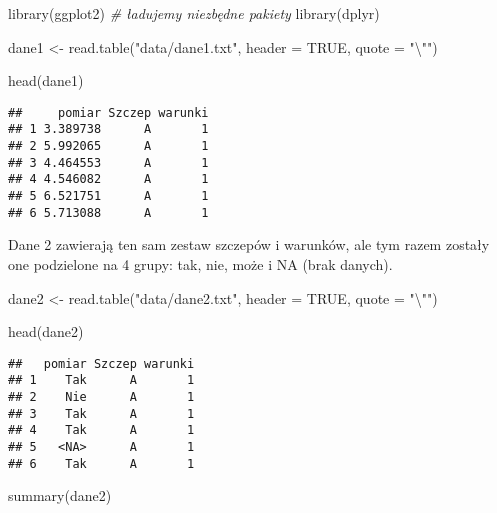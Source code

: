 \documentclass[
]{book}
\newenvironment{Shaded}{\begin{snugshade}}{\end{snugshade}}
\newcommand{\AttributeTok}[1]{\textcolor[rgb]{0.77,0.63,0.00}{#1}}
\newcommand{\CommentTok}[1]{\textcolor[rgb]{0.56,0.35,0.01}{\textit{#1}}}
\newcommand{\ConstantTok}[1]{\textcolor[rgb]{0.00,0.00,0.00}{#1}}
\newcommand{\FunctionTok}[1]{\textcolor[rgb]{0.00,0.00,0.00}{#1}}
\newcommand{\NormalTok}[1]{#1}
\newcommand{\OtherTok}[1]{\textcolor[rgb]{0.56,0.35,0.01}{#1}}
\newcommand{\SpecialCharTok}[1]{\textcolor[rgb]{0.00,0.00,0.00}{#1}}
\newcommand{\StringTok}[1]{\textcolor[rgb]{0.31,0.60,0.02}{#1}}
\begin{document}
\begin{Shaded}
\begin{Highlighting}[]
\FunctionTok{library}\NormalTok{(ggplot2) }\CommentTok{\# ładujemy niezbędne pakiety}
\FunctionTok{library}\NormalTok{(dplyr)}

\NormalTok{dane1 }\OtherTok{\textless{}{-}} \FunctionTok{read.table}\NormalTok{(}\StringTok{"data/dane1.txt"}\NormalTok{, }\AttributeTok{header =} \ConstantTok{TRUE}\NormalTok{, }\AttributeTok{quote =} \StringTok{"}\SpecialCharTok{\textbackslash{}"}\StringTok{"}\NormalTok{)}

\FunctionTok{head}\NormalTok{(dane1)}
\end{Highlighting}
\end{Shaded}

\begin{verbatim}
##     pomiar Szczep warunki
## 1 3.389738      A       1
## 2 5.992065      A       1
## 3 4.464553      A       1
## 4 4.546082      A       1
## 5 6.521751      A       1
## 6 5.713088      A       1
\end{verbatim}

Dane 2 zawierają ten sam zestaw szczepów i warunków, ale tym razem zostały one podzielone na 4 grupy: tak, nie, może i NA (brak danych).

\begin{Shaded}
\begin{Highlighting}[]
\NormalTok{dane2 }\OtherTok{\textless{}{-}} \FunctionTok{read.table}\NormalTok{(}\StringTok{"data/dane2.txt"}\NormalTok{, }\AttributeTok{header =} \ConstantTok{TRUE}\NormalTok{, }\AttributeTok{quote =} \StringTok{"}\SpecialCharTok{\textbackslash{}"}\StringTok{"}\NormalTok{)}

\FunctionTok{head}\NormalTok{(dane2)}
\end{Highlighting}
\end{Shaded}

\begin{verbatim}
##   pomiar Szczep warunki
## 1    Tak      A       1
## 2    Nie      A       1
## 3    Tak      A       1
## 4    Tak      A       1
## 5   <NA>      A       1
## 6    Tak      A       1
\end{verbatim}

\begin{Shaded}
\begin{Highlighting}[]
\FunctionTok{summary}\NormalTok{(dane2)}
\end{Highlighting}
\end{Shaded}
\end{document}
